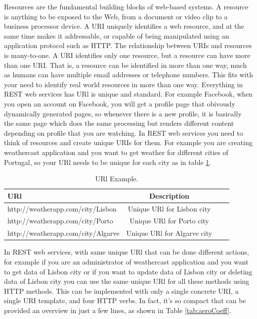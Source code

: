 Resources are the fundamental building blocks of web-based systems. A resource is anything to be exposed to the Web,
from a document or video clip to a business processor device. A URI uniquely identifies a web resource, and at the same time makes it addressable, or capable of being manipulated using an application protocol such as HTTP. The relationship between URIs and resources is many-to-one\citep{thesis:state5_2}. A URI identifies only one resource, but a resource can have more than one URI. That is, a resource can be identified in more than one way, much as humans can have multiple email addresses or telephone numbers. This fits with your need to identify real world resources in more than one way. Everything in REST web services has URl is unique and standard. For example Facebook, when you open an account on Facebook, you will get a profile page that obivously dynamically generated pages, so whenever there is a new profile, it is basically the same page which does the same processing but renders different content depending on profile that you are watching. In REST web services you need to think of resources and create unique URIs for them. For example you are creating weathercast application and you want to get weather for different cities of Portugal, so your URl needs to be unique for each city as in table \ref{tab:urlexample}.

\begin{table}[!htb]
  \renewcommand{\arraystretch}{1.2} %
  \centering
  \begin{tabular}{lccc}
    \toprule
    URl & Description  \\
    \midrule
    http://weatherapp.com/city/Lisbon &  Unique URl for Lisbon city\\
    http://weatherapp.com/city/Porto & Unique URl for Porto city\\
    http://weatherapp.com/city/Algarve & Unique URl for Algarve city\\
    \bottomrule
  \end{tabular}
  \caption[URl Example.]{URl Example.}
  \label{tab:urlexample}
\end{table}

In REST web services, with same unique URl that can be done different actions, for example if you are an administrator of weathercast application and you want to get data of Lisbon city or if you want to update data of Lisbon city or deleting data of Lisbon city you can use the same unique URl for all these methods using HTTP methods. This can be implemented with only a single concrete URI, a single URI template, and four HTTP verbs. In fact, it’s so compact that can be provided an overview in just a few lines, as shown in Table \ref{tab:aeroCoeff}.

